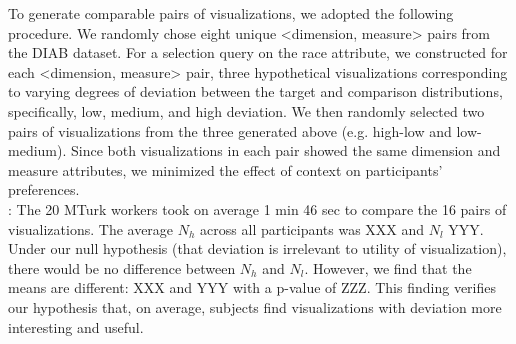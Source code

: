 To generate comparable pairs of visualizations, 
we adopted the following procedure.
We randomly chose eight unique <dimension, measure> pairs from the DIAB dataset.
For a selection query on the race attribute, we constructed for each <dimension, measure> pair, three hypothetical visualizations corresponding to varying degrees of deviation between the target and comparison distributions, specifically, low, medium, and high deviation.
We then randomly selected two pairs of visualizations from the three generated above (e.g. high-low and low-medium).
Since both visualizations in each pair showed the same dimension and measure attributes, we minimized the effect of context on participants' preferences.\\
: The 20 MTurk workers took on average 
1 min 46 sec to compare the 16 pairs of visualizations.
The average $N_h$ across all participants was XXX and $N_l$ YYY.
Under our null hypothesis (that deviation is irrelevant to utility of visualization),
there would be no difference between $N_{h}$ and $N_{l}$.
However, we find that the means are different: XXX and YYY with a p-value of ZZZ.
This finding verifies our hypothesis that, on average, subjects 
find visualizations with deviation more interesting and useful.



% 

